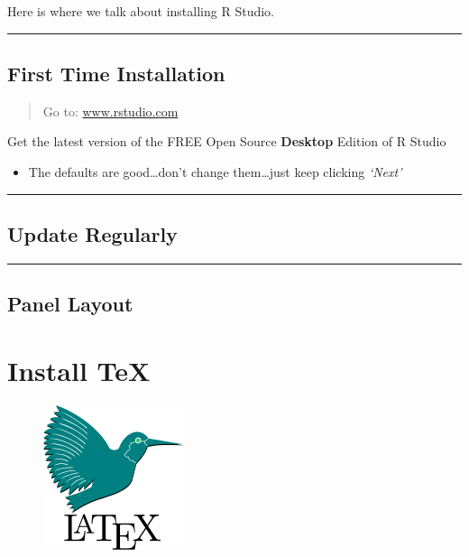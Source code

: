 \documentclass[]{book}
\providecommand{\tightlist}{%
  \setlength{\itemsep}{0pt}\setlength{\parskip}{0pt}}
\begin{document}
Here is where we talk about installing R Studio.

\begin{center}\rule{0.5\linewidth}{\linethickness}\end{center}

\section{First Time Installation}\label{first-time-installation-1}

\begin{quote}
Go to: \href{http://www.rstudio.com}{www.rstudio.com}
\end{quote}

Get the latest version of the FREE Open Source \textbf{Desktop} Edition
of R Studio

\begin{itemize}
\tightlist
\item
  The defaults are good\ldots{}don't change them\ldots{}just keep
  clicking \emph{`Next'}
\end{itemize}

\begin{center}\rule{0.5\linewidth}{\linethickness}\end{center}

\section{Update Regularly}\label{update-regularly-1}

\begin{center}\rule{0.5\linewidth}{\linethickness}\end{center}

\section{Panel Layout}\label{panel-layout}

\chapter{Install TeX}\label{install-tex}

\begin{figure}
\centering
\includegraphics{images/latex.png}
\caption{}
\end{figure}
\end{document}
